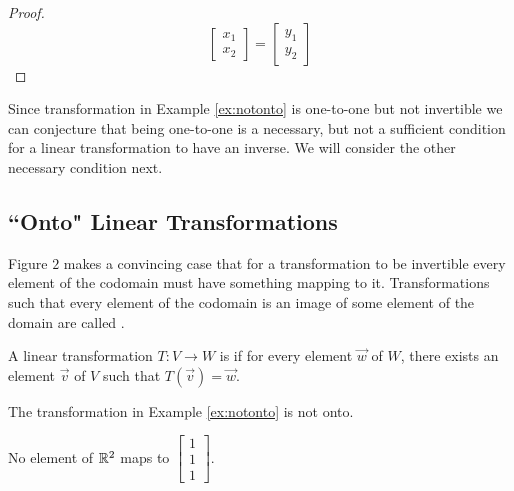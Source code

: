 \documentclass{ximera}
\begin{document}
\begin{example}
\begin{proof}
$$\begin{bmatrix}x_1\\x_2\end{bmatrix}=\begin{bmatrix}y_1\\y_2\end{bmatrix}$$
\end{proof}
\end{example}

Since transformation in Example \ref{ex:notonto} is one-to-one but not invertible we can conjecture that being one-to-one is a necessary, but not a sufficient condition for a linear transformation to have an inverse.  We will consider the other necessary condition next.

\subsection*{``Onto" Linear Transformations}
Figure $2$ makes a convincing case that for a transformation to be invertible every element of the codomain must have something mapping to it. Transformations such that every element of the codomain is an image of some element of the domain are called .

\begin{definition}[Onto]\label{def:onto} A linear transformation $T:V\rightarrow W$ is  if for every element $\vec{w}$ of $W$, there exists an element $\vec{v}$ of $V$ such that $T(\vec{v})=\vec{w}$.
\end{definition}

\begin{example}\label{ex:notonto2}
The transformation in Example \ref{ex:notonto} is not onto.
\begin{explanation}
No element of $\mathbb{R}^2$ maps to $\begin{bmatrix}1\\1\\1\end{bmatrix}$.
\end{explanation}
\end{example}
\end{document}
